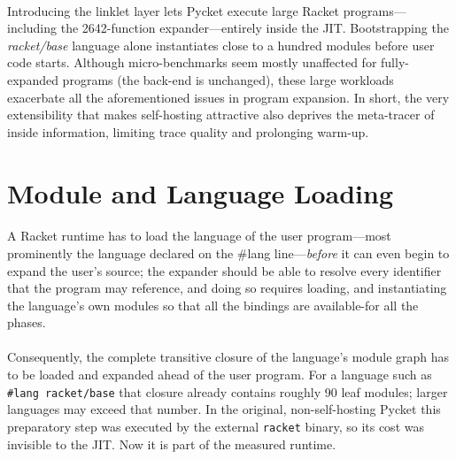 	\paragraph{}%
		Introducing the linklet layer lets Pycket execute large Racket programs—including the 2642-function expander—entirely inside the JIT. Bootstrapping the \emph{racket/base} language alone instantiates close to a hundred modules before user code starts. Although micro-benchmarks seem mostly unaffected for fully-expanded programs (the back-end is unchanged), these large workloads exacerbate all the aforementioned issues in program expansion. In short, the very extensibility that makes self-hosting attractive also deprives the meta-tracer of inside information, limiting trace quality and prolonging warm-up.

	\section[\texorpdfstring{Module and Language Loading}{Loading a Language}]{Module and Language Loading}
	\label{section:module-and-language-loading}


		\paragraph{}%
			A Racket runtime has to load the language of the user program—most prominently the language declared on the \#lang line—\emph{before} it can even begin to expand the user's source; the expander should be able to resolve every identifier that the program may reference, and doing so requires loading, and instantiating the language's own modules so that all the bindings are available-for all the phases.


		\paragraph{}%
			Consequently, the complete transitive closure of the language's module graph has to be loaded and expanded ahead of the user program. For a language such as \texttt{\#lang racket/base} that closure already contains roughly 90 leaf modules; larger languages may exceed that number. In the original, non-self-hosting Pycket this preparatory step was executed by the external \texttt{racket} binary, so its cost was invisible to the JIT. Now it is part of the measured runtime.


